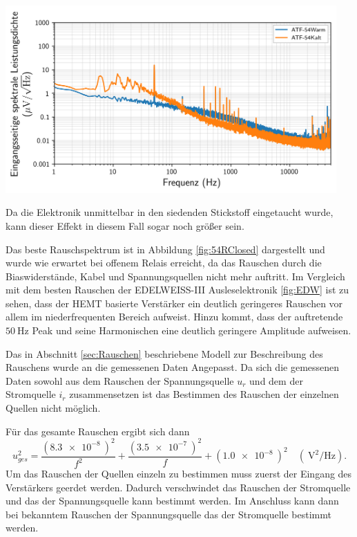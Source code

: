 \begin{minipage}[!c]{\textwidth}
\begin{minipage}[c]{\textwidth}
\includegraphics[width=0.95\textwidth]{./fig/Rauschen/F54.png}
\vspace{-0.5cm}
\label{subfig:54}
\end{minipage}
\label{fig:Rauschen}
\end{minipage}
\clearpage

Da die Elektronik unmittelbar in den siedenden Stickstoff eingetaucht wurde, kann dieser Effekt in diesem Fall sogar noch größer sein.

Das beste Rauschspektrum ist in Abbildung \ref{fig:54RClosed} dargestellt und wurde wie erwartet bei offenem Relais erreicht, da das Rauschen durch die Biaswiderstände, Kabel und Spannungsquellen nicht mehr auftritt.
Im Vergleich mit dem besten Rauschen der EDELWEISS-III Ausleselektronik \ref{fig:EDW} ist zu sehen, dass der HEMT basierte Verstärker ein deutlich geringeres Rauschen vor allem im niederfrequenten Bereich aufweist.
Hinzu kommt, dass der auftretende $\SI{50}{\hertz}$ Peak und seine Harmonischen eine deutlich geringere Amplitude aufweisen.

Das in Abschnitt \ref{sec:Rauschen} beschriebene Modell zur Beschreibung des Rauschens wurde an die gemessenen Daten Angepasst.
Da sich die gemessenen Daten sowohl aus dem Rauschen der Spannungsquelle $u_r$ und dem der Stromquelle $i_r$ zusammensetzen ist das Bestimmen des Rauschen der einzelnen Quellen nicht möglich.


Für das gesamte Rauschen ergibt sich dann
\begin{equation}
u^2_{ges} = \frac{(\SI{8.3e-8}{})^2}{f^2} + \frac{(\SI{3.5e-7}{})^2}{f} + (\SI{1.0e-8}{})^2 \quad (\SI{}{\volt\squared\per\hertz}).
\end{equation}
Um das Rauschen der Quellen einzeln zu bestimmen muss zuerst der Eingang des Verstärkers geerdet werden.
Dadurch verschwindet das Rauschen der Stromquelle und das der Spannungsquelle kann bestimmt werden.
Im Anschluss kann dann bei bekanntem Rauschen der Spannungsquelle das der Stromquelle bestimmt werden.

